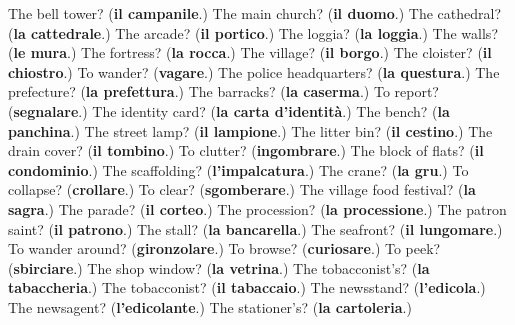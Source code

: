 \begin{tcolorbox}[breakable,colback=teal!4,colframe=teal!35!black,title={Before you move on}]
The bell tower? (\textbf{il campanile}.) The main church? (\textbf{il duomo}.) The cathedral? (\textbf{la cattedrale}.) The arcade? (\textbf{il portico}.) The loggia? (\textbf{la loggia}.) The walls? (\textbf{le mura}.) The fortress? (\textbf{la rocca}.) The village? (\textbf{il borgo}.) The cloister? (\textbf{il chiostro}.) To wander? (\textbf{vagare}.) The police headquarters? (\textbf{la questura}.) The prefecture? (\textbf{la prefettura}.) The barracks? (\textbf{la caserma}.) To report? (\textbf{segnalare}.) The identity card? (\textbf{la carta d'identità}.) The bench? (\textbf{la panchina}.) The street lamp? (\textbf{il lampione}.) The litter bin? (\textbf{il cestino}.) The drain cover? (\textbf{il tombino}.) To clutter? (\textbf{ingombrare}.) The block of flats? (\textbf{il condominio}.) The scaffolding? (\textbf{l'impalcatura}.) The crane? (\textbf{la gru}.) To collapse? (\textbf{crollare}.) To clear? (\textbf{sgomberare}.) The village food festival? (\textbf{la sagra}.) The parade? (\textbf{il corteo}.) The procession? (\textbf{la processione}.) The patron saint? (\textbf{il patrono}.) The stall? (\textbf{la bancarella}.) The seafront? (\textbf{il lungomare}.) To wander around? (\textbf{gironzolare}.) To browse? (\textbf{curiosare}.) To peek? (\textbf{sbirciare}.) The shop window? (\textbf{la vetrina}.) The tobacconist's? (\textbf{la tabaccheria}.) The tobacconist? (\textbf{il tabaccaio}.) The newsstand? (\textbf{l'edicola}.) The newsagent? (\textbf{l'edicolante}.) The stationer's? (\textbf{la cartoleria}.)
\end{tcolorbox}
